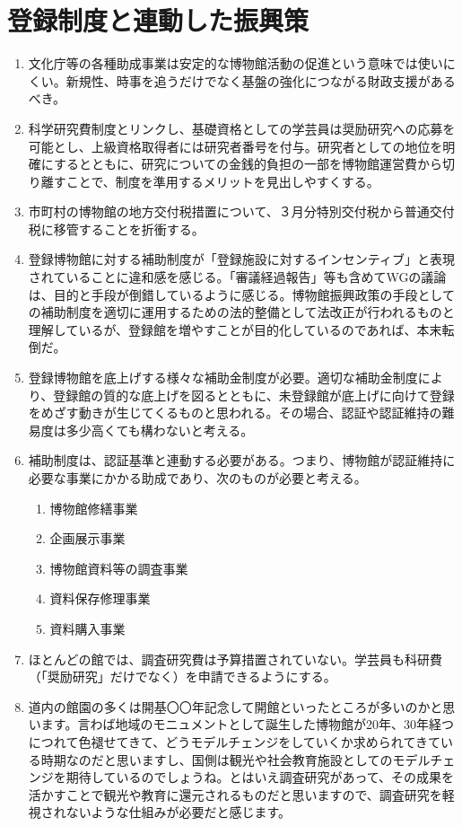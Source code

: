 \documentclass[12pt]{jsarticle}
\begin{document}
\section{登録制度と連動した振興策}
\begin{enumerate}
	\item 文化庁等の各種助成事業は安定的な博物館活動の促進という意味では使いにくい。新規性、時事を追うだけでなく基盤の強化につながる財政支援があるべき。
	\item 科学研究費制度とリンクし、基礎資格としての学芸員は奨励研究への応募を可能とし、上級資格取得者には研究者番号を付与。研究者としての地位を明確にするとともに、研究についての金銭的負担の一部を博物館運営費から切り離すことで、制度を準用するメリットを見出しやすくする。
	\item 市町村の博物館の地方交付税措置について、３月分特別交付税から普通交付税に移管することを折衝する。
	\item 登録博物館に対する補助制度が「登録施設に対するインセンティブ」と表現されていることに違和感を感じる。「審議経過報告」等も含めてWGの議論は、目的と手段が倒錯しているように感じる。博物館振興政策の手段としての補助制度を適切に運用するための法的整備として法改正が行われるものと理解しているが、登録館を増やすことが目的化しているのであれば、本末転倒だ。
	\item 登録博物館を底上げする様々な補助金制度が必要。適切な補助金制度により、登録館の質的な底上げを図るとともに、未登録館が底上げに向けて登録をめざす動きが生じてくるものと思われる。その場合、認証や認証維持の難易度は多少高くても構わないと考える。
	\item 補助制度は、認証基準と連動する必要がある。つまり、博物館が認証維持に必要な事業にかかる助成であり、次のものが必要と考える。
	\begin{enumerate}
		\item 博物館修繕事業
		\item 企画展示事業
		\item 博物館資料等の調査事業
		\item 資料保存修理事業
		\item 資料購入事業
	\end{enumerate}
	\item ほとんどの館では、調査研究費は予算措置されていない。学芸員も科研費（「奨励研究」だけでなく）を申請できるようにする。
	\item 道内の館園の多くは開基〇〇年記念して開館といったところが多いのかと思います。言わば地域のモニュメントとして誕生した博物館が20年、30年経つにつれて色褪せてきて、どうモデルチェンジをしていくか求められてきている時期なのだと思いますし、国側は観光や社会教育施設としてのモデルチェンジを期待しているのでしょうね。とはいえ調査研究があって、その成果を活かすことで観光や教育に還元されるものだと思いますので、調査研究を軽視されないような仕組みが必要だと感じます。

\end{enumerate}
\end{document}
